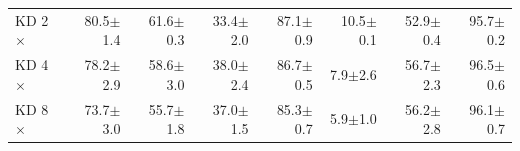 \begin{tabular}{lrrrrrrr}
\midrule
KD 2$\times$ & 80.5{\scriptsize$\pm$1.4} & 61.6{\scriptsize$\pm$0.3} & 33.4{\scriptsize$\pm$2.0} & 87.1{\scriptsize$\pm$0.9} & 10.5{\scriptsize$\pm$0.1} & 52.9{\scriptsize$\pm$0.4} & 95.7{\scriptsize$\pm$0.2} \\
KD 4$\times$ & 78.2{\scriptsize$\pm$2.9} & 58.6{\scriptsize$\pm$3.0} & 38.0{\scriptsize$\pm$2.4} & 86.7{\scriptsize$\pm$0.5} & 7.9{\scriptsize$\pm$2.6} & 56.7{\scriptsize$\pm$2.3} & 96.5{\scriptsize$\pm$0.6} \\
KD 8$\times$ & 73.7{\scriptsize$\pm$3.0} & 55.7{\scriptsize$\pm$1.8} & 37.0{\scriptsize$\pm$1.5} & 85.3{\scriptsize$\pm$0.7} & 5.9{\scriptsize$\pm$1.0} & 56.2{\scriptsize$\pm$2.8} & 96.1{\scriptsize$\pm$0.7} \\
\bottomrule
\end{tabular}
